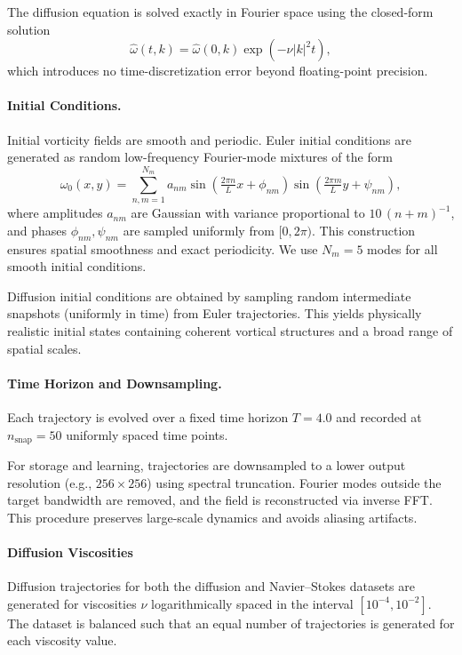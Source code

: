 \documentclass{article}
\theoremstyle{plain}
\theoremstyle{definition}
\theoremstyle{remark}
\begin{document}
The diffusion equation is solved exactly in Fourier space using the closed-form
solution
\begin{equation}
\hat{\omega}(t,k) = \hat{\omega}(0,k)\exp\!\left(-\nu |k|^2 t\right),
\end{equation}
which introduces no time-discretization error beyond floating-point precision.

\paragraph{Initial Conditions.}
Initial vorticity fields are smooth and periodic. Euler initial conditions are
generated as random low-frequency Fourier-mode mixtures of the form
\begin{equation}
\omega_0(x,y) =
\sum_{n,m=1}^{N_m} a_{nm}
\sin\!\left(\tfrac{2\pi n}{L}x + \phi_{nm}\right)
\sin\!\left(\tfrac{2\pi m}{L}y + \psi_{nm}\right),
\end{equation}
where amplitudes \(a_{nm}\) are Gaussian with variance proportional to
\(10\,(n+m)^{-1}\), and phases \(\phi_{nm}, \psi_{nm}\) are sampled uniformly from
\([0,2\pi)\). This construction ensures spatial smoothness and exact
periodicity. We use \(N_m = 5\) modes for all smooth initial conditions.

Diffusion initial conditions are obtained by sampling random intermediate
snapshots (uniformly in time) from Euler trajectories. This yields physically
realistic initial states containing coherent vortical structures and a broad
range of spatial scales.

\paragraph{Time Horizon and Downsampling.}
Each trajectory is evolved over a fixed time horizon \(T = 4.0\) and recorded at
\(n_{\text{snap}} = 50\) uniformly spaced time points.

For storage and learning, trajectories are downsampled to a lower output
resolution (e.g., \(256 \times 256\)) using spectral truncation. Fourier modes
outside the target bandwidth are removed, and the field is reconstructed via
inverse FFT. This procedure preserves large-scale dynamics and avoids aliasing
artifacts.

\paragraph{Diffusion Viscosities} Diffusion trajectories for both the diffusion and Navier--Stokes datasets are
generated for viscosities \(\nu\) logarithmically spaced in the interval
\([10^{-4}, 10^{-2}]\). The dataset is balanced such that an equal number of
trajectories is generated for each viscosity value.
\end{document}
